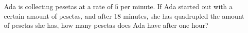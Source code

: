 Ada is collecting pesetas at a rate of $5$ per minute. If Ada started out with a certain amount of pesetas, and after $18$ minutes, she has quadrupled the amount of pesetas she has, how many pesetas does Ada have after one hour?

